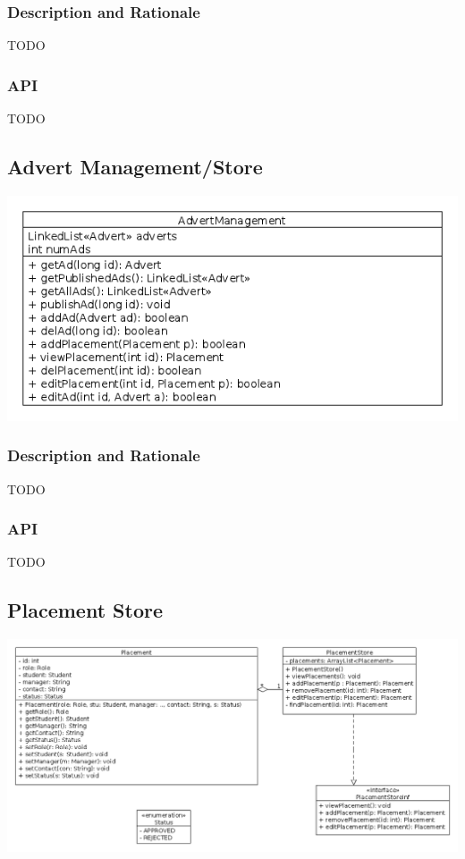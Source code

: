 \documentclass{l3deliverable}
\begin{document}
\subsubsection{Description and Rationale}
TODO
\subsubsection{API}
TODO

\subsection{Advert Management/Store}
\includegraphics[scale = 0.5]{adStore.png}
\\
\subsubsection{Description and Rationale}
TODO
\subsubsection{API}
TODO

\subsection{Placement Store}
\includegraphics[scale = 0.4]{ClassDiagram_PlacementStore.png}
\\
\end{document}
